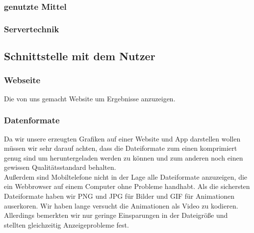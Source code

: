\subsubsection{genutzte Mittel} %

\subsubsection{Servertechnik} %

\subsection{Schnittstelle mit dem Nutzer} %

\subsubsection{Webseite} %
Die von uns gemacht Website um Ergebnisse anzuzeigen.

\subsubsection{Datenformate} %
Da wir unsere erzeugten Grafiken auf einer Website und App darstellen wollen müssen wir sehr darauf achten,
dass die Dateiformate zum einen komprimiert genug sind um heruntergeladen werden zu können und zum anderen noch einen gewissen Qualitätsstandard behalten.\\
Außerdem sind Mobiltelefone nicht in der Lage alle Dateiformate anzuzeigen,
die ein Webbrowser auf einem Computer ohne Probleme handhabt.
Als die sichersten Dateiformate haben wir PNG und JPG für Bilder und GIF für Animationen auserkoren.
Wir haben lange versucht die Animationen als Video zu kodieren.
Allerdings bemerkten wir nur geringe Einsparungen in der Dateigröße und stellten gleichzeitig Anzeigeprobleme fest.

